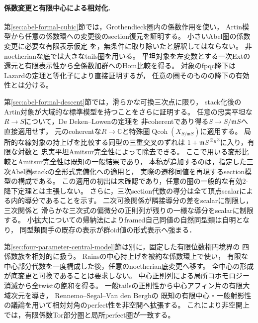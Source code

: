 \documentclass[11pt,a4paper]{ltjsarticle}
\numberwithin{equation}{section}
\newcommand{\C}{\mathbb C}
\begin{document}
\paragraph{係数変更と有限中心による相対化.}
第\ref{sec:abel-formal-cubic}節では，Grothendieck圏内の係数作用を使い，
Artin模型から任意の係数環への変更後のsection復元を証明する。
小さいAbel圏の係数変更に必要な有限表示仮定
\cite[\S4]{LowenVdBDeformation}を，無条件に取り除いたと解釈してはならない。
非noetherianな底では大きなtails圏を用いる。
平坦対象を左変数とする一次Extの還元と有限表示性から全係数加群へのHom比較を得る。
対象のfpqc降下はLazardの定理と等化子により直接証明するが，
任意の圏そのものの降下の有効性とは分ける。

第\ref{sec:abel-formal-descent}節では，滑らかな可換三次点に限り，
stack化後のArtin対象が大域的な標準模型を持つことをさらに証明する。
任意の忠実平坦な$R\to S$について，De Deken--Lowenの定理を
非coherentであり得る$S\to S/\mathfrak mS$へ直接適用せず，
元のcoherentな$R\to\C$と特殊圏$\operatorname{Qcoh}(X_{S/\mathfrak mS})$に適用する。
局所的な線対象の持上げを比較する同型の三重交叉のずれは
$1+\mathfrak mS^{\otimes_R3}$に入り，有限な対数と
忠実平坦Amitsur完全性\cite[Tag~023M]{StacksAbel}によって除去できる。
ここで用いる変形比較とAmitsur完全性は既知の一般結果であり，
本稿が追加するのは，指定した三次Abel圏stackの全形式完備化への適用と，
実際の遷移同値を再現するsection模型の構成である。
この適用の初出は未確認であり，任意の圏の一般的な有効$2$-降下定理とは主張しない。
さらに，三次section代数の導分は全て頂点scalarによる内的導分であることを示す。
二次可換関係が隣接導分の差をscalarに制限し，三次関係と
滑らかな三次式の偏微分の正則列が残りの一様な導分をscalarに制限する。
小拡大についての帰納法によりframed自己同値の自然同型類は自明となり，
同型類関手の既存の表示が群oid値の形式表示へ強まる．

第\ref{sec:four-parameter-central-model}節は別に，固定した有限位数楕円境界の
四係数族を相対的に扱う。
Rains\cite[Theorem~2.13]{CSBGRainsElliptic}の中心持上げを被約な係数環上で使い，
有限な中心部分代数を一度構成した後，任意のnoetherian底変更へ移す。
全中心の形成が底変更と可換であることは要求しない。
中心正則列による局所コホモロジー消滅から全twistの飽和を得る。
一般tailsの正則性から中心アフィン片の有限大域次元を導き，
Rennemo--Segal--Van den Bergh\cite[Proposition~2.1 and Corollary~3.9]{CSBGRSVBertini}の
既知の有限中心・一般射影性の議論を用いて相対対角のperfect性を非空開へ拡張する。
これにより非空開上では，有限係数Tor部分圏と局所perfect圏が一致する。
\end{document}
